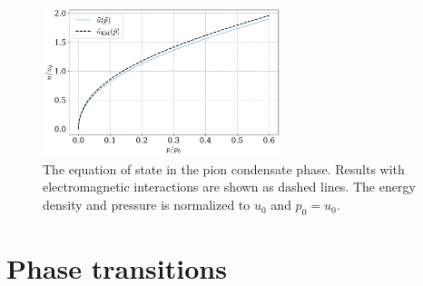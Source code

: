 \begin{figure}[!htb]
    \centering
    \includegraphics[width=0.62\textwidth]{../scripts/figurer/pion_star/pion_eos_EM.pdf}
    \caption{
        The equation of state in the pion condensate phase. 
        Results with electromagnetic interactions are shown as dashed lines.
        The energy density and pressure is normalized to $u_0$ and $p_0 = u_0$.
        }
    \label{fig: eos chpt em interaction}
\end{figure}





\section{Phase transitions}
\label{section: phase transition}


